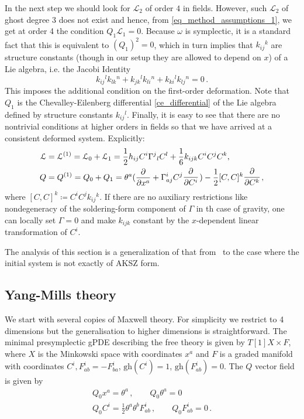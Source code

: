 \documentclass[a4paper,12pt]{article}
\numberwithin{equation}{section} %
\newcommand{\gh}[1]{\mathrm{gh}(#1)}
\renewcommand{\d}{\partial}
\newcommand{\ffrac}[2]{\raisebox{.5pt}%
  {\footnotesize$\displaystyle\frac{#1}{#2}$}\kern1pt}
\newcommand{\dl}[1]{\mathchoice{\ffrac{\d}{\d #1}}{\frac{\d}{\d #1}}{\ffrac{\d}{\d #1}}{\ffrac{\d}{\d #1}}}
\def\cL{\mathcal{L}}
\newcommand{\pdv}[1]{\frac{\d}{\d #1}}
\newcommand{\h}{\cL}
\begin{document}
In the next step we should look for $\cL_2$ of order $4$ in fields. However, such $\cL_2$ of ghost degree $3$ does not exist and hence, from \eqref{eq_method_assumptions_1}, we get at order 4 the condition $Q_1\cL_1=0$. Because $\omega$ is symplectic, it is a standard fact that this is equivalent to $(Q_1)^2=0$, which in turn implies that $k_{ij}{}^k$ are structure constants (though in our setup they are allowed to depend on $x$) of a Lie algebra, i.e. the Jacobi Identity
\begin{equation}
\label{Jacobi}
k_{ij}{}^l k_{lk}{}^n 
    +
    k_{jk}{}^lk_{li}{}^n
    +
    k_{ki}{}^lk_{lj}{}^n= 0\,.
\end{equation}
This imposes the additional condition on the first-order deformation. Note that $Q_1$ is the Chevalley-Eilenberg differential \eqref{ce_differential} of the Lie algebra defined by structure constants $k_{ij}{}^l$. Finally, it is easy to see that there are no nontrivial conditions at higher orders in fields so that we have arrived at a consistent deformed system. Explicitly:
\begin{align}
	\h &= \h^{(1)} = \h_0 + \h_1 =  \frac{1}{2} h_{ij}C^i\Gamma^j{}_l C^l+ \frac{1}{6}k_{ijk} C^i C^j C^k, \\
	Q &= Q^{(1)} = Q_0 + Q_1 = \theta^a(\pdv{x^a}+\Gamma^i_{aj}C^j\dl{C^i}) -\frac{1}{2} [C,C]^k \dl{C^k},
\end{align}
where $[C,C]^k \coloneqq C^i C^j k_{ij}{}^k$. If there are no auxiliary restrictions like nondegeneracy of the soldering-form component of $\Gamma$ in th case of gravity, one can locally set $\Gamma=0$ and make $k_{ijk}$ constant by the $x$-dependent linear transformation of $C^i$.

The analysis of this section is a generalization of that from~\cite{Barnich:2009jy,Grigoriev:2020lzu} to the case where the initial system is not exactly of AKSZ form. 


\subsection{Yang-Mills theory}

We start with several copies of Maxwell theory. For simplicity we restrict to 4 dimensions but the generalisation to higher dimensions is straightforward. The minimal presymplectic gPDE describing the free theory is given by $T[1]X \times F$, where $X$ is the Minkowski space with coordinates $x^a$ and $F$ is a graded manifold with coordinates $C^i,F^i_{ab}=-F^i_{ba}$, $\gh{C^i}=1$, $\gh{F^i_{ab}}=0$. The $Q$ vector field  is given by
\begin{align}	
	\label{mmm}		
			Q_0 x^a = \theta^a\,,  \qquad 
			Q_0 \theta^a = 0 \\
			Q_0 C^i = \frac{1}{2} \theta^a \theta^b F^i_{ab}\,, \qquad
			Q_0 F^i_{ab} = 0\,.
\end{align}
\end{document}
